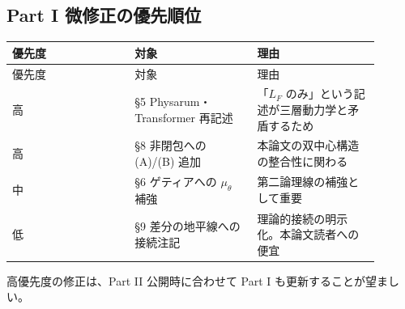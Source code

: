 \subsection{Part I 微修正の優先順位}


\begin{longtable}{@{}p{0.30\linewidth}p{0.30\linewidth}p{0.30\linewidth}@{}}
\toprule
優先度 & 対象 & 理由 \\
\midrule
\endfirsthead
\toprule
優先度 & 対象 & 理由 \\
\midrule
\endhead
高 & \S{}5 Physarum・Transformer 再記述 & 「$L_F$ のみ」という記述が三層動力学と矛盾するため \\
高 & \S{}8 非閉包への (A)/(B) 追加 & 本論文の双中心構造の整合性に関わる \\
中 & \S{}6 ゲティアへの $\mu_\theta$ 補強 & 第二論理線の補強として重要 \\
低 & \S{}9 差分の地平線への接続注記 & 理論的接続の明示化。本論文読者への便宜 \\
\bottomrule
\end{longtable}


高優先度の修正は、Part II 公開時に合わせて Part I も更新することが望ましい。

\bigskip
